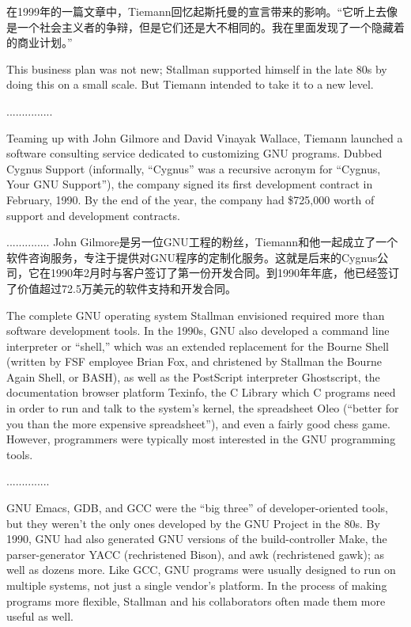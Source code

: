 \ifdefined\chs
在1999年的一篇文章中，Tiemann回忆起斯托曼的宣言带来的影响。“它听上去像是一个社会主义者的争辩，但是它们还是大不相同的。我在里面发现了一个隐藏着的商业计划。” 
\fi

\ifdefined\eng
This business plan was not new; Stallman supported himself in the late 80s by doing this on a small scale.  But Tiemann intended to take it to a new level.
\fi

\ifdefined\chs
...............
\fi

\ifdefined\eng
Teaming up with John Gilmore and David Vinayak Wallace, Tiemann launched a software consulting service dedicated to customizing GNU programs. Dubbed Cygnus Support (informally, ``Cygnus'' was a recursive acronym for ``Cygnus, Your GNU Support''), the company signed its first development contract in February, 1990. By the end of the year, the company had \$725,000 worth of support and development contracts.
\fi

\ifdefined\chs
..............
John Gilmore是另一位GNU工程的粉丝，Tiemann和他一起成立了一个软件咨询服务，专注于提供对GNU程序的定制化服务。这就是后来的Cygnus公司，它在1990年2月时与客户签订了第一份开发合同。到1990年年底，他已经签订了价值超过72.5万美元的软件支持和开发合同。
\fi

\ifdefined\eng
The complete GNU operating system Stallman envisioned required more than software development tools.  In the 1990s, GNU also developed a command line interpreter or ``shell,'' which was an extended replacement for the Bourne Shell (written by FSF employee Brian Fox, and christened by Stallman the Bourne Again Shell, or BASH), as well as the PostScript interpreter Ghostscript, the documentation browser platform Texinfo, the C Library which C programs need in order to run and talk to the system's kernel, the spreadsheet Oleo (``better for you than the more expensive spreadsheet''), and even a fairly good chess game.  However, programmers were typically most interested in the GNU programming tools.
\fi

\ifdefined\chs
..............
\fi

\ifdefined\eng
GNU Emacs, GDB, and GCC were the ``big three'' of developer-oriented tools, but they weren't the only ones developed by the GNU Project in the 80s. By 1990, GNU had also generated GNU versions of the build-controller Make, the parser-generator YACC (rechristened Bison), and awk (rechristened gawk); as well as dozens more. Like GCC, GNU programs were usually designed to run on multiple systems, not just a single vendor's platform. In the process of making programs more flexible, Stallman and his collaborators often made them more useful as well.
\fi

